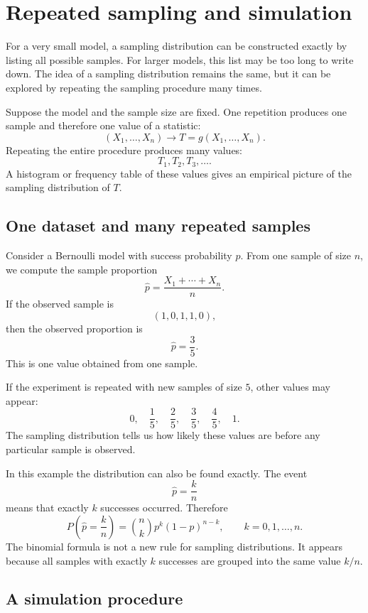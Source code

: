 \section{Repeated sampling and simulation}

For a very small model, a sampling distribution can be constructed exactly by
listing all possible samples. For larger models, this list may be too long to
write down. The idea of a sampling distribution remains the same, but it can be
explored by repeating the sampling procedure many times.

Suppose the model and the sample size are fixed. One repetition produces one
sample and therefore one value of a statistic:
\[
(X_1,\ldots,X_n)
\longrightarrow
T=g(X_1,\ldots,X_n).
\]
Repeating the entire procedure produces many values:
\[
T_1,T_2,T_3,\ldots.
\]
A histogram or frequency table of these values gives an empirical picture of the
sampling distribution of \(T\).

\subsection*{One dataset and many repeated samples}

Consider a Bernoulli model with success probability \(p\). From one sample of
size \(n\), we compute the sample proportion
\[
\widehat p=\frac{X_1+\cdots+X_n}{n}.
\]
If the observed sample is
\[
(1,0,1,1,0),
\]
then the observed proportion is
\[
\widehat p=\frac35.
\]
This is one value obtained from one sample.

If the experiment is repeated with new samples of size \(5\), other values may
appear:
\[
0,\quad \frac15,\quad \frac25,\quad \frac35,\quad \frac45,\quad 1.
\]
The sampling distribution tells us how likely these values are before any
particular sample is observed.

In this example the distribution can also be found exactly. The event
\[
\widehat p=\frac{k}{n}
\]
means that exactly \(k\) successes occurred. Therefore
\[
P\left(\widehat p=\frac{k}{n}\right)
=
\binom nk p^k(1-p)^{n-k},
\qquad k=0,1,\ldots,n.
\]
The binomial formula is not a new rule for sampling distributions. It appears
because all samples with exactly \(k\) successes are grouped into the same value
\(k/n\).

\subsection*{A simulation procedure}

